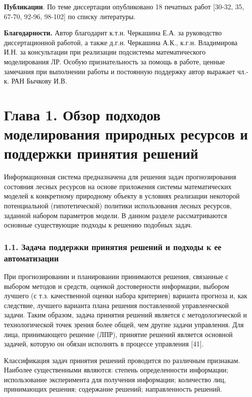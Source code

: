 \documentclass{article}
\begin{document}
\textbf{Публикации}. По теме диссертации опубликовано 
18 печатных работ [30-32, 35, 67-70, 92-96, 98-102] по списку 
литературы.

\textbf{Благодарности. }Автор благодарит к.т.н. 
Черкашина Е.А. за руководство диссертационной 
работой, а также д.г.н. Черкашина А.К., к.г.н. Владимирова 
И.Н. за консультации при реализации подсистемы 
математического моделирования ЛР. Особую признательность 
за помощь в работе, ценные замечания при выполнении 
работы и постоянную поддержку автор выражает 
чл.-к. РАН Бычкову И.В.\pagebreak{}\label{HToc199746715}

\section*{\textbf{Глава 1. Обзор подходов моделирования 
природных ресурсов и поддержки принятия решений}}

Информационная система предназначена для решения 
задач прогнозирования состояния лесных ресурсов 
на основе приложения системы математических 
моделей к конкретному природному объекту в 
условиях реализации некоторой потенциальной 
(гипотетической) политики использования лесных 
ресурсов, заданной набором параметров модели. 
В данном разделе рассматриваются основные 
существующие подходы к решению подобных задач.\label{HToc199746716}

\subsubsection*{\textbf{1.1. Задача поддержки принятия решений 
и подходы к ее автоматизации}}

При прогнозировании и планировании принимаются 
решения, связанные с выбором методов и средств, 
оценкой достоверности информации, выбором 
лучшего (с т.з. качественной оценки набора критериев) 
варианта прогноза и, как следствие, лучшего 
варианта плана решения поставленной управленческой 
задачи. Таким образом, задача принятия решений 
является с методологической и технологической 
точек зрения более общей, чем другие задачи 
управления. Для лица, принимающего решение 
(ЛПР), принятие решений является основной задачей, 
которую он обязан исполнять в процессе управления 
[41].  

Классификация задач принятия решений проводится 
по различным признакам. Наиболее существенными 
являются: степень определенности информации; 
использование эксперимента для получения информации; 
количество лиц, принимающих решения; содержание 
решений; направленность решений.
\end{document}
